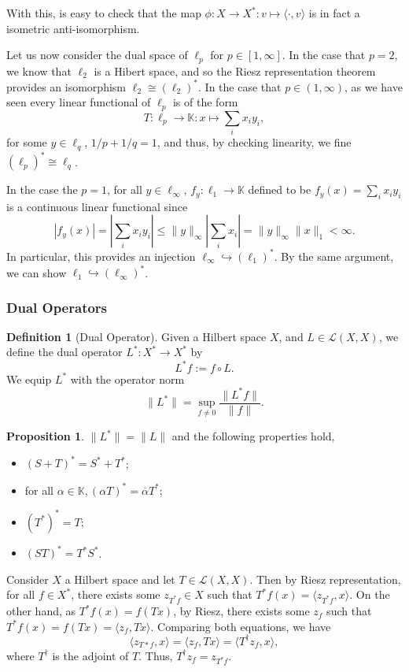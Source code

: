 \documentclass[]{article}
\theoremstyle{definition}
\theoremstyle{definition}
\newtheorem{definition}{Definition}[section]
\newtheorem{proposition}{Proposition}[section]
\begin{document}
With this, is easy to check that the map \(\phi : X \to X^* : 
v \mapsto \langle \cdot, v \rangle\) is in fact a isometric anti-isomorphism.

Let us now consider the dual space of \(\ell_p\) for \(p \in [1, \infty]\). 
In the case that \(p = 2\), we know that \(\ell_2\) is a Hibert space, and 
so the Riesz representation theorem provides an isomorphism 
\(\ell_2 \cong (\ell_2)^*\). In the case that \(p \in (1, \infty)\), as 
we have seen every linear functional of \(\ell_p\) is of the form 
\[T : \ell_p \to \mathbb{K} : x \mapsto \sum_i x_i y_i,\]
for some \(y \in \ell_q\), \(1 / p + 1 / q = 1\), and thus, by checking 
linearity, we fine \((\ell_p)^* \cong \ell_q\).

In the case the \(p = 1\), for all \(y \in \ell_\infty\), 
\(f_y : \ell_1 \to \mathbb{K}\) defined to be \(f_y(x) = \sum_i x_i y_i\) is 
a continuous linear functional since 
\[|f_y(x)| = \left| \sum_i x_i y_i \right| \le 
  \|y\|_\infty \left|\sum_i x_i \right| = \|y\|_\infty\|x\|_1 < \infty.\]
In particular, this provides an injection 
\(\ell_\infty \hookrightarrow (\ell_1)^*\). By the same argument, we can 
show \(\ell_1 \hookrightarrow (\ell_\infty)^*\).

\subsubsection{Dual Operators}

\begin{definition}[Dual Operator]
  Given a Hilbert space \(X\), and \(L \in \mathcal{L}(X, X)\), we define the 
  dual operator \(L^* : X^* \to X^*\) by 
  \[L^* f := f \circ L.\]
  We equip \(L^*\) with the operator norm 
  \[\|L^*\| = \sup_{f \neq 0} \frac{\|L^* f\|}{\|f\|}.\]
\end{definition}

\begin{proposition}
  \(\|L^*\| = \|L\|\) and the following properties hold,
  \begin{itemize}
    \item \((S + T)^* = S^* + T^*\);
    \item for all \(\alpha \in \mathbb{K}, (\alpha T)^* = \overline{\alpha} T^*\);
    \item \((T^*)^* = T\);
    \item \((ST)^* = T^* S^*\). 
  \end{itemize}
\end{proposition}

Consider \(X\) a Hilbert space and let \(T \in \mathcal{L}(X, X)\). Then 
by Riesz representation, for all \(f \in X^*\), there exists some \(z_{T^*f} \in X\) 
such that \(T^* f(x) = \langle z_{T^*f}, x \rangle\). On the other hand, as 
\(T^*f(x) = f(Tx)\), by Riesz, there exists some \(z_f\) such that 
\(T^*f(x) = f(Tx) = \langle z_f, Tx \rangle\). Comparing both equations, we 
have 
\[\langle z_{T* f}, x \rangle = \langle z_f, Tx\rangle = 
  \langle T^\dagger z_f, x\rangle,\]
where \(T^\dagger\) is the adjoint of \(T\). Thus, \(T^\dagger z_f = z_{T^* f}\).
\end{document}
